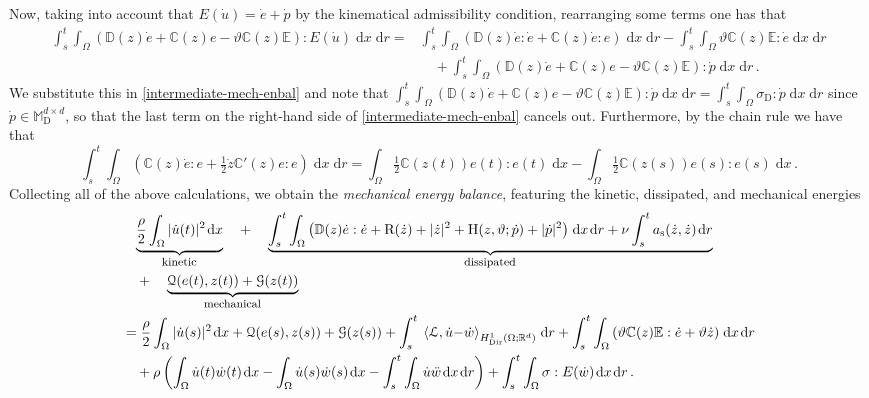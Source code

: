 \documentclass[a4paper,10pt,reqno]{amsart}
\numberwithin{equation}{section}
\newcommand{\bbM}{\mathbb{M}}
\newcommand{\R}{\mathbb{R}}
\numberwithin{equation}{section}
\def\calG{{\mathcal G}} \def\calH{{\mathcal H}} \def\calI{{\mathcal I}}
\def\dd{\;\!\mathrm{d}} %
\newcommand{\pairing}[4]{ \sideset{_{ #1 }}{_{ #2 }}  {\mathop{\langle #3 , #4
\rangle}}}
\newcommand{\teta}{\vartheta}
\newcommand{\DDDn}[2]{\begin{array}[t]{c}#1\vspace*{-1em}\\_{#2}\end{array}}
\newcommand{\dddn}[2]{\DDDn{\begin{array}[t]{c}\underbrace{#1}\vspace*{.6em}\end{array}}{\text{\footnotesize #2}}}
\newcommand{\sig}[1]{E(#1)}
\newcommand{\Dir}{\mathrm{Dir}}
\newcommand{\bbC}{\mathbb{C}}
\newcommand{\bbD}{\mathbb{D}}
\newcommand{\bbE}{\mathbb{E}}
\newcommand{\bbB}{\mathbb{B}}
\newcommand{\mt}{\bbM}
\newcommand{\dev}{\mathrm{D}}
\newcommand{\dip}[3]{\mathrm{H}(#1,#2;#3)}
\newcommand{\did}[1]{\mathrm{R}(#1)}
\newcommand{\ass}{a_{\mathrm{s}}}
\begin{document}
Now, taking into account that $ \sig{\dot u}  =\dot e + \dot p$ by the kinematical admissibility condition,  rearranging some terms one has that 
\[
\begin{aligned}
 \int_s^t\int_\Omega \left(  \bbD(z) \dot{e}  + \bbC(z) e  -  \teta \bbC(z) \bbE \right)  : \sig{\dot{u}} \dd x \dd r  = &  
 \int_s^t \int_\Omega \left( \bbD (z)\dot e : \dot e  + \bbC(z) \dot e : e  \right) \dd x \dd r   -  \int_s^t \int_\Omega \teta \bbC(z) \bbE : \dot e \dd x \dd  r
 \\
 & \quad + \int_s^t \int_\Omega \left(  \bbD(z) \dot e+ \bbC(z) e  - 
\teta \bbC(z) \bbE \right)   : \dot p   \dd x \dd r \,. %
\end{aligned}
\]
We substitute  this in \eqref{intermediate-mech-enbal} and  note that $  \int_s^t \int_\Omega \left(\bbD(z) \dot e  + \bbC(z) e - \teta \bbC(z) \bbE \right)  : \dot{p} \dd x \dd r =
 \int_s^t \int_\Omega \sigma_\dev : \dot{p} \dd x \dd r   $ since $\dot{p} \in \mt_\dev^{d\times d}$, so that the last term on the right-hand side of \eqref{intermediate-mech-enbal} cancels out.
 Furthermore, by the chain rule we have that 
 \[
 \int_s^t \int_\Omega  \left( \bbC(z) \dot e : e {+}  \tfrac12 \dot {z}  \bbC'(z) e{:} e \right)  \dd x \dd r = 
 \int_\Omega \tfrac12 \bbC(z(t))e(t){:}e(t)  \dd x -  \int_\Omega \tfrac12 \bbC(z(s))e(s){:}e(s)  \dd x \,.
 \]
 Collecting all of the above calculations, we obtain 
 the \emph{mechanical energy balance}, featuring the kinetic, dissipated, and mechanical energies
\begin{equation}
\label{mech-enbal}
\begin{aligned}
& 
\dddn{\frac{\rho}2 \int_\Omega |\dot{u}(t)|^2 \dd x}{kinetic} +\dddn{ \int_s^t\int_\Omega   \left(
 \bbD(z) \dot e: \dot e  + \did{\dot{z}} + |\dot{z}|^2 +  \dip{z}{\teta}{\dot p}  + |\dot p|^2 \right)  \dd x \dd r + \nu \int_s^t  \ass(\dot{z}, \dot{z}) \dd r  }{dissipated}
 \\
 & \quad 
+ \dddn{\calQ(e(t),z(t)) + \calG(z(t))}{mechanical}
\\
&  =  \frac{\rho}2 \int_\Omega |\dot{u}(s)|^2 \dd x   + \calQ(e(s),z(s)) + \calG(z(s)) + \int_s^t \pairing{}{H_\Dir^1 (\Omega;\R^d)}{\mathcal{L}}{\dot u{-} \dot w} \dd r  +  
 \int_s^t \int_\Omega  \left( \teta \bbC(z) \bbE : \dot e + \teta \dot{z} \right) \dd x \dd  r
 \\
& \quad   +\rho \left( \int_\Omega \dot{u}(t) \dot{w}(t) \dd x -  \int_\Omega \dot{u}(s) \dot{w}(s) \dd x - \int_s^t \int_\Omega \dot{u}\ddot w \dd x \dd r \right)  
  + 
\int_s^t \int_\Omega  \sigma : \sig{\dot w} \dd x \dd r\,. %
 \end{aligned}
\end{equation}
\end{document}
